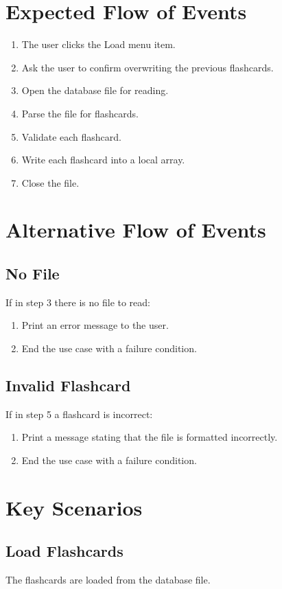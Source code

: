 \documentclass{scrreprt}
\begin{document}
\section{Expected Flow of Events}
\begin{enumerate}[1.]
    \item The user clicks the Load menu item.
    \item Ask the user to confirm overwriting the previous flashcards.
    \item Open the database file for reading.
    \item Parse the file for flashcards.
    \item Validate each flashcard.
    \item Write each flashcard into a local array.
    \item Close the file.
\end{enumerate}

\section{Alternative Flow of Events}

    \subsection{No File}
    If in step 3 there is no file to read:
    \begin{enumerate}
        \item Print an error message to the user.
        \item End the use case with a failure condition.
    \end{enumerate}

    \subsection{Invalid Flashcard}
    If in step 5 a flashcard is incorrect:
    \begin{enumerate}
        \item Print a message stating that the file is formatted incorrectly.
        \item End the use case with a failure condition.
    \end{enumerate}

\section{Key Scenarios}
    \subsection{Load Flashcards}
    The flashcards are loaded from the database file.
\end{document}
